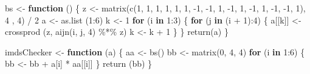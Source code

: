 \documentclass[
  12pt,
]{book}
\newenvironment{Shaded}{\begin{snugshade}}{\end{snugshade}}
\newcommand{\ControlFlowTok}[1]{\textcolor[rgb]{0.13,0.29,0.53}{\textbf{#1}}}
\newcommand{\DecValTok}[1]{\textcolor[rgb]{0.00,0.00,0.81}{#1}}
\newcommand{\FunctionTok}[1]{\textcolor[rgb]{0.00,0.00,0.00}{#1}}
\newcommand{\NormalTok}[1]{#1}
\newcommand{\OtherTok}[1]{\textcolor[rgb]{0.56,0.35,0.01}{#1}}
\newcommand{\SpecialCharTok}[1]{\textcolor[rgb]{0.00,0.00,0.00}{#1}}
\theoremstyle{definition}
\theoremstyle{definition}
\theoremstyle{definition}
\theoremstyle{definition}
\theoremstyle{remark}
\begin{document}
\begin{Shaded}
\begin{Highlighting}[]
\NormalTok{bs }\OtherTok{\textless{}{-}} \ControlFlowTok{function}\NormalTok{ () \{}
\NormalTok{  z }\OtherTok{\textless{}{-}} \FunctionTok{matrix}\NormalTok{(}\FunctionTok{c}\NormalTok{(}\DecValTok{1}\NormalTok{, }\DecValTok{1}\NormalTok{, }\DecValTok{1}\NormalTok{, }\DecValTok{1}\NormalTok{, }\DecValTok{1}\NormalTok{, }\DecValTok{1}\NormalTok{, }\SpecialCharTok{{-}}\DecValTok{1}\NormalTok{, }\SpecialCharTok{{-}}\DecValTok{1}\NormalTok{, }\DecValTok{1}\NormalTok{, }\SpecialCharTok{{-}}\DecValTok{1}\NormalTok{, }\DecValTok{1}\NormalTok{, }\SpecialCharTok{{-}}\DecValTok{1}\NormalTok{, }\DecValTok{1}\NormalTok{, }\SpecialCharTok{{-}}\DecValTok{1}\NormalTok{, }\SpecialCharTok{{-}}\DecValTok{1}\NormalTok{, }\DecValTok{1}\NormalTok{), }\DecValTok{4}\NormalTok{ , }\DecValTok{4}\NormalTok{) }\SpecialCharTok{/} \DecValTok{2}
\NormalTok{  a }\OtherTok{\textless{}{-}} \FunctionTok{as.list}\NormalTok{ (}\DecValTok{1}\SpecialCharTok{:}\DecValTok{6}\NormalTok{)}
\NormalTok{  k }\OtherTok{\textless{}{-}} \DecValTok{1}
  \ControlFlowTok{for}\NormalTok{ (i }\ControlFlowTok{in} \DecValTok{1}\SpecialCharTok{:}\DecValTok{3}\NormalTok{) \{}
    \ControlFlowTok{for}\NormalTok{ (j }\ControlFlowTok{in}\NormalTok{ (i }\SpecialCharTok{+} \DecValTok{1}\NormalTok{)}\SpecialCharTok{:}\DecValTok{4}\NormalTok{) \{}
\NormalTok{      a[[k]] }\OtherTok{\textless{}{-}} \FunctionTok{crossprod}\NormalTok{ (z, }\FunctionTok{aijn}\NormalTok{(i, j, }\DecValTok{4}\NormalTok{) }\SpecialCharTok{\%*\%}\NormalTok{ z)}
\NormalTok{      k }\OtherTok{\textless{}{-}}\NormalTok{ k }\SpecialCharTok{+} \DecValTok{1}
\NormalTok{    \}}
\NormalTok{  \}}
  \FunctionTok{return}\NormalTok{(a)}
\NormalTok{\}}

\NormalTok{imdsChecker }\OtherTok{\textless{}{-}} \ControlFlowTok{function}\NormalTok{ (a) \{}
\NormalTok{  aa }\OtherTok{\textless{}{-}} \FunctionTok{bs}\NormalTok{()}
\NormalTok{  bb }\OtherTok{\textless{}{-}} \FunctionTok{matrix}\NormalTok{(}\DecValTok{0}\NormalTok{, }\DecValTok{4}\NormalTok{, }\DecValTok{4}\NormalTok{)}
  \ControlFlowTok{for}\NormalTok{ (i }\ControlFlowTok{in} \DecValTok{1}\SpecialCharTok{:}\DecValTok{6}\NormalTok{) \{}
\NormalTok{    bb }\OtherTok{\textless{}{-}}\NormalTok{ bb }\SpecialCharTok{+}\NormalTok{ a[i] }\SpecialCharTok{*}\NormalTok{ aa[[i]]}
\NormalTok{  \}}
  \FunctionTok{return}\NormalTok{ (bb)}
\NormalTok{\}}


\end{Highlighting}
\end{Shaded}
\end{document}
